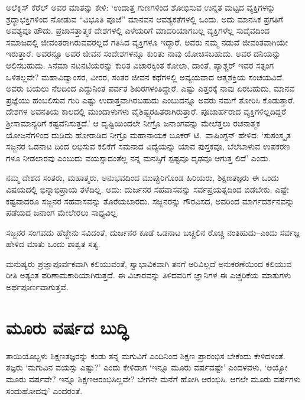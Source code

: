 ಅಲೆಕ್ಸಿಸ್ ಕೆರೆಲ್​ ಅವರ ಮಾತನ್ನು ಕೇಳಿ: ‘ಉದಾತ್ತ ಗುಣಗಳಿಂದ ಶೋಭಿಸುವ ಉನ್ನತ ಮಟ್ಟದ ವ್ಯಕ್ತಿಗಳನ್ನು ಶ್ರದ್ಧಾಭಕ್ತಿಗಳಿಂದ ನೋಡುವ “ವಿಭೂತಿ ಪೂಜೆ” ಮಾನವನ ಆವಶ್ಯಕತೆಗಳಲ್ಲಿ ಒಂದು. ಅದು ಮಾನಸಿಕ ಪ್ರಗತಿಗೆ ಅವಶ್ಯವೂ ಹೌದು. ಪ್ರಜಾಸತ್ತಾತ್ಮಕ ದೇಶಗಳಲ್ಲಿ ಎಳೆಯರಿಗೆ ಮಾದರಿಯಾಗಬಲ್ಲ ವ್ಯಕ್ತಿಗಳೆಲ್ಲ ಸುದೈವದಿಂದ ಸಮಾಜದಲ್ಲಿ ಜೀವಂತರಾಗಿರುವವರಲ್ಲದೆ ಗತಿಸಿದ ವ್ಯಕ್ತಿಗಳೂ ಇದ್ದಾರೆ. ಅವರು ನಮ್ಮ ನಡುವೆ ಜೀವಂತವಾಗಿಯೇ ಇರುತ್ತಾರೆ. ಅವರನ್ನೂ ಅವರ ಜೀವನ ಸಂದೇಶಗಳನ್ನೂ ಕುರಿತು ನಾವು ಯೋಚಿಸಬಹುದು. ಅವರ ದನಿಯನ್ನು ಆಲಿಸಬಹುದು. ಸಿನೆಮಾ ನಟನಟಿಯರನ್ನು ಕುರಿತ ವಿಚಾರಕ್ಕಿಂತ ಕೋಲಾ, ದಾಂತೆ, ಪ್ಯಾಶ್ಚರ್ ಇವರ ಸತ್ಸಂಗ ಒಳಿತಲ್ಲವೇ? ಮಹಾವಿದ್ವಾಂಸರ, ವೀರರ, ಸಂತರ ಜೀವನ ಕಥೆಗಳಲ್ಲಿ ಅವ್ಯಯವಾದ ಆತ್ಮಶಕ್ತಿಯ ಸಂಚಯವಿದೆ. ಅವರು ಬಯಲು ನೆಲದಿಂದ ಎದ್ದುನಿಂತ ಪರ್ವತ ಶಿಖರಗಳಂತಿದ್ದಾರೆ. ಎಷ್ಟು ಎತ್ತರಕ್ಕೆ ನಾವು ಏರಬಹುದು, ಮಾನವ ಪ್ರಜ್ಞೆಯು ಹಂಬಲಿಸುವ ಗುರಿ ಎಷ್ಟು ಉದಾತ್ತವಾಗಿರಬಹುದು ಎಂಬುದನ್ನೂ ಅವರು ನಮಗೆ ತೋರಿಸಿ ಕೊಡುತ್ತಾರೆ. ದೇಶಗಳ ಅವನತಿಯ ಕಾಲದಲ್ಲಿ ಮುಂದಾಳುಗಳು ವೈಶಿಷ್ಟ್ಯರಹಿತರಾಗಿರುತ್ತಾರೆ. ಪೂಜಾರ್ಹರಾದ ವ್ಯಕ್ತಿ\-ಗಳಿಲ್ಲದಿದ್ದರೆ ಶ‍್ರೀಸಾಮಾನ್ಯರಿಗೆ ಕಷ್ಟವೆನಿಸುತ್ತದೆ.’ ಆ ದೃಷ್ಟಿಯಿಂದಲೇ ನೀಗ್ರೊ ಜನಾಂಗವನ್ನು ಮೇಲೆತ್ತಲು ರಚನಾತ್ಮಕ ಯೋಜನೆಗಳಿಂದ ದುಡಿದು ಹೋರಾಡಿದ ನೀಗ್ರೊ ಮಹಾನಾಯಕ ಬೂಕರ್ ಟಿ.\ ವಾಷಿಂಗ್ಟನ್ ಹೇಳಿದ: ‘ಸುಸಂಸ್ಕೃತ ಸಜ್ಜನರ ಒಡನಾಟ ದಿಂದ ಲಭಿಸುವ ಕಲಿಕೆಗೆ ಸಮನಾದ ವಿದ್ಯೆಯನ್ನು ಯಾವ ಪುಸ್ತಕವೂ, ಬೆಲೆಬಾಳುವ ಉಪಕರಣ ಗಳೂ ನೀಡಲಾರವು ಎಂಬುದು ವಯಸ್ಸಾದಂತೆಲ್ಲ ನನ್ನ ಮನಸ್ಸಿಗೆ ಸ್ಪಷ್ಟವೂ ದೃಢವೂ ಆಗುತ್ತ ಲಿದೆ’ ಎಂದು.

\vskip 2pt

ನಮ್ಮ ದೇಶದ ಸಂತರು, ಮಹಾತ್ಮರು, ಅನುಭವದಿಂದ ಮುಪ್ಪುರಿಗೊಂಡ ಹಿರಿಯರು, ಶಿಕ್ಷಣತಜ್ಞರು ಈ ಒಂದು ವಿಷಯದಲ್ಲಿ ಭಿನ್ನಾಭಿಪ್ರಾಯ ತಳೆದಿಲ್ಲ. ಅದು: ದುರ್ಜನರ ಸಹವಾಸವನ್ನು ಸರ್ವಪ್ರಯತ್ನದಿಂದ ಬಿಡಬೇಕು. ಎಷ್ಟೇ ಕಷ್ಟವಾದರೂ ಸಜ್ಜನರ ಸಹವಾಸವನ್ನು ತೊರೆಯಬಾರದು. ಸಜ್ಜನರನ್ನು ಗೌರವಿಸದ, ಅವರಿಂದ ಮಾರ್ಗದರ್ಶನವನ್ನು ಪಡೆಯದ ಜನಾಂಗ ಮೇಲೇರಲು ಸಾಧ್ಯವಿಲ್ಲ.

\vskip 2pt

ಸಜ್ಜನರ ಸಂಗವದು ಹೆಜ್ಜೇನು ಸವಿದಂತೆ, ದುರ್ಜನರ ಕೂಡೆ ಒಡನಾಟ ಬಚ್ಚಲಿನ ರೊಚ್ಚಿ ನಂತಿಹುದು–ಎಂದು ಸರ್ವಜ್ಞ ಹೇಳಿದ ಮಾತು ಒಂದು ಶಾಶ್ವತ ಸತ್ಯ.

\vskip 2pt

ಮನುಷ್ಯರು ಪ್ರಜ್ಞಾಪೂರ್ವಕವಾಗಿ ಕಲಿಯುವಂತೆ, ಸ್ವಾಭಾವಿಕವಾಗಿ ತನಗೆ ಅರಿವಿಲ್ಲದೆ ಅನುಕರಣೆಯಿಂದ ಕಲಿಯುವ ರೀತಿ ಅತ್ಯಂತ ಪರಿಣಾಮಕಾರಿಯಾಗಿರುತ್ತದೆ. ಈ ವಿಚಾರವನ್ನು ತಿಳಿದವರಿಗೆ ಜ್ಞಾನಿಗಳ ಈ ಎಚ್ಚರಿಕೆಯ ಮಾತುಗಳು ಅರ್ಥಪೂರ್ಣವಾಗುತ್ತವೆ.


\section*{ಮೂರು ವರ್ಷದ ಬುದ್ಧಿ}


ತಾಯಿಯೊಬ್ಬಳು ಶಿಕ್ಷಣತಜ್ಞರನ್ನು ಕಂಡು ತನ್ನ ಮಗುವಿಗೆ ಎಂದಿನಿಂದ ಶಿಕ್ಷಣ ಪ್ರಾರಂಭಿಸ ಬೇಕೆಂದು ಕೇಳಿದಳಂತೆ. ತಜ್ಞರು ‘ಮಗುವಿನ ವಯಸ್ಸು ಎಷ್ಟು?’ ಎಂದು ಕೇಳಿದಾಗ ‘ಇನ್ನೂ ಮೂರು ವರ್ಷವಷ್ಟೇ’ ಎಂದಳವಳು, ‘ಅಯ್ಯೋ ಮೂರು ವರ್ಷವೇ? ಇನ್ನೂ ಶಿಕ್ಷಣ\break ಆರಂಭಿಸಿಲ್ಲವೇ? ಬೇಗನೇ ಮನೆಗೆ ಹೋಗಿ ಆರಂಭಿಸಿ. ಆಗಲೇ ಮೂರು ವರ್ಷಗಳು ಸಂದುಹೋದವು’ ಎಂದರಂತೆ.

